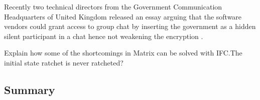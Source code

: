 Recently two technical directors from the Government Communication Headquarters of United Kingdom released an essay arguing that the software vendors could grant access to group chat by inserting the government as a hidden silent participant in a chat hence not weakening the encryption \cite{gchq}.


Explain how some of the shortcomings in Matrix can be solved with IFC.The initial state ratchet is never ratcheted?

\subsection{Summary}
















